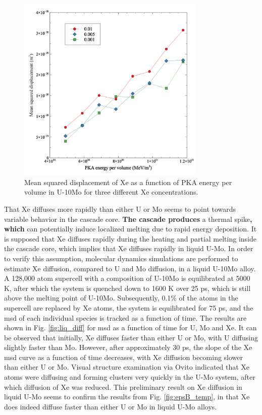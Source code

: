 \documentclass[review]{elsarticle}
\providecommand{\DIFaddtex}[1]{{\bf #1}} %
\providecommand{\DIFdeltex}[1]{} %
\providecommand{\DIFaddbegin}{\protect\color{blue}} %
\providecommand{\DIFaddend}{\protect\color{black}} %
\providecommand{\DIFdelbegin}{\protect\color{red}} %
\providecommand{\DIFdelend}{\protect\color{black}} %
\providecommand{\DIFadd}[1]{\texorpdfstring{\DIFaddtex{#1}}{#1}} %
\providecommand{\DIFdel}[1]{\texorpdfstring{\DIFdeltex{#1}}{}} %
\newcommand{\DIFscaledelfig}{0.5}
\newlength{\DIFdelgraphicswidth} %
\newlength{\DIFdelgraphicsheight} %
\newcommand{\DIFaddincludegraphics}[2][]{{\color{blue}\fbox{\DIFOincludegraphics[#1]{#2}}}} %
\newcommand{\DIFdelincludegraphics}[2][]{%
\sbox{\DIFdelgraphicsbox}{\DIFOincludegraphics[#1]{#2}}%
\settoboxwidth{\DIFdelgraphicswidth}{\DIFdelgraphicsbox} %
\settoboxtotalheight{\DIFdelgraphicsheight}{\DIFdelgraphicsbox} %
\scalebox{\DIFscaledelfig}{%
\parbox[b]{\DIFdelgraphicswidth}{\usebox{\DIFdelgraphicsbox}\\[-\baselineskip] \rule{\DIFdelgraphicswidth}{0em}}\llap{\resizebox{\DIFdelgraphicswidth}{\DIFdelgraphicsheight}{%
\setlength{\unitlength}{\DIFdelgraphicswidth}%
\begin{picture}(1,1)%
\thicklines\linethickness{2pt} %
{\color[rgb]{1,0,0}\put(0,0){\framebox(1,1){}}}%
{\color[rgb]{1,0,0}\put(0,0){\line( 1,1){1}}}%
{\color[rgb]{1,0,0}\put(0,1){\line(1,-1){1}}}%
\end{picture}%
}\hspace*{3pt}}} %
} %
\DeclareRobustCommand{\DIFaddbegin}{\DIFOaddbegin \let\includegraphics\DIFaddincludegraphics} %
\DeclareRobustCommand{\DIFaddend}{\DIFOaddend \let\includegraphics\DIFOincludegraphics} %
\DeclareRobustCommand{\DIFdelbegin}{\DIFOdelbegin \let\includegraphics\DIFdelincludegraphics} %
\DeclareRobustCommand{\DIFdelend}{\DIFOaddend \let\includegraphics\DIFOincludegraphics} %
\begin{document}
\begin{figure}[h]
 \centering
 \includegraphics[width=0.8\textwidth]{4_xefrac.png} 
 \caption{Mean squared displacement of Xe as a function of PKA energy per volume in U-10Mo for three different Xe concentrations.}
 \label{fig:xefrac}
\end{figure}

That Xe diffuses more rapidly than either U or Mo seems to point towards variable behavior in the cascade core. \DIFdelbegin \DIFdel{There exists }\DIFdelend \DIFaddbegin \DIFadd{The cascade produces }\DIFaddend a thermal spike\DIFdelbegin \DIFdel{due to a cascade that }\DIFdelend \DIFaddbegin \DIFadd{, which }\DIFaddend can potentially induce localized melting due to rapid energy deposition. It is supposed that Xe diffuses rapidly during the heating and partial melting inside the cascade core, which implies that Xe diffuses rapidly in liquid U-Mo. In order to verify this assumption, molecular dynamics simulations are performed to estimate Xe diffusion, compared to U and Mo diffusion, in a liquid U-10Mo alloy. A 128,000 atom supercell with a composition of U-10Mo is equilibrated at 5000 K, after which the system is quenched down to 1600 K over 25 ps, which is still above the melting point of U-10Mo. Subsequently, 0.1\% of the atoms in the supercell are replaced by Xe atoms, the system is equilibrated for 75 ps, and the msd of each individual species is tracked as a function of time. The results are shown in Fig. \ref{fig:liq_diff} for msd as a function of time for U, Mo and Xe. It can be observed that initially, Xe diffuses faster than either U or Mo, with U diffusing slightly faster than Mo. However, after approximately 30 ps, the slope of the Xe msd curve as a function of time decreases, with Xe diffusion becoming slower than either U or Mo. Visual structure examination via Ovito \cite{ovito} indicated that Xe atoms were diffusing and forming clusters very quickly in the U-Mo system, after which diffusion of Xe was reduced. This preliminary result on Xe diffusion in liquid U-Mo seems to confirm the results from Fig. \ref{fig:epsB_temp}, in that Xe does indeed diffuse faster than either U or Mo in liquid U-Mo alloys.
\end{document}
